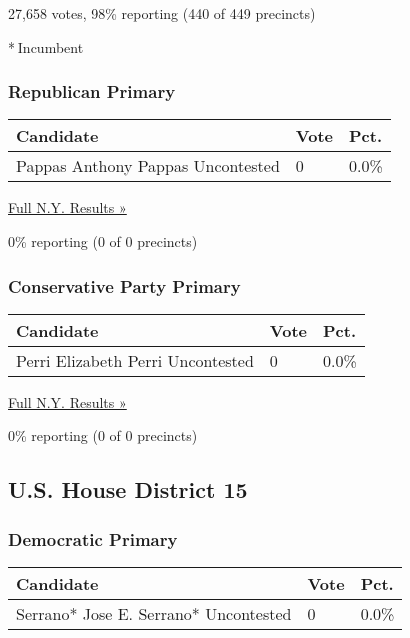 27,658 votes, 98\% reporting (440 of 449 precincts)

* Incumbent

\hypertarget{republican-primary-10}{%
\subsubsection{Republican Primary}\label{republican-primary-10}}

\begin{longtable}[]{@{}lll@{}}
\toprule
Candidate & Vote & Pct.\tabularnewline
\midrule
\endhead
 Pappas Anthony Pappas Uncontested & 0 & 0.0\%\tabularnewline
\bottomrule
\end{longtable}

\href{https://www.nytimes3xbfgragh.onion/elections/results/new-york}{Full
N.Y. Results »}

0\% reporting (0 of 0 precincts)

\hypertarget{conservative-party-primary-2}{%
\subsubsection{Conservative Party
Primary}\label{conservative-party-primary-2}}

\begin{longtable}[]{@{}lll@{}}
\toprule
Candidate & Vote & Pct.\tabularnewline
\midrule
\endhead
 Perri Elizabeth Perri Uncontested & 0 & 0.0\%\tabularnewline
\bottomrule
\end{longtable}

\href{https://www.nytimes3xbfgragh.onion/elections/results/new-york}{Full
N.Y. Results »}

0\% reporting (0 of 0 precincts)

\hypertarget{us-house-district-15}{%
\subsection{U.S. House District 15}\label{us-house-district-15}}

\hypertarget{democratic-primary-15}{%
\subsubsection{Democratic Primary}\label{democratic-primary-15}}

\begin{longtable}[]{@{}lll@{}}
\toprule
Candidate & Vote & Pct.\tabularnewline
\midrule
\endhead
 Serrano* Jose E. Serrano* Uncontested & 0 & 0.0\%\tabularnewline
\bottomrule
\end{longtable}


